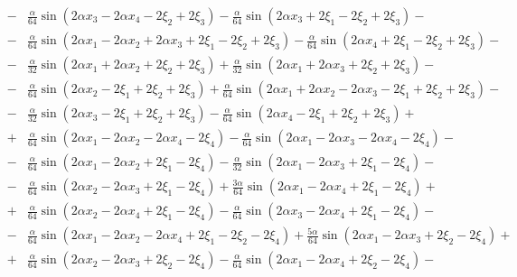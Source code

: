 \documentclass[11pt]{jfm}
\numberwithin{equation}{section}
\begin{document}
\begin{eqnarray}
&\!-\!&\frac{\alpha}{64} \sin(2\alpha x_3 \!-\! 2\alpha x_4 \!-\! 2\xi_2 \!+\! 2\xi_3) \!-\! \frac{\alpha}{64} \sin(2\alpha x_3 \!+\! 2\xi_1 \!-\! 2\xi_2 \!+\! 2\xi_3)\!-\!\nonumber\\
&\!-\!& \frac{\alpha}{64} \sin(2\alpha x_1 \!-\! 2\alpha x_2 \!+\! 2\alpha x_3 \!+\! 2\xi_1 \!-\! 2\xi_2 \!+\! 2\xi_3)\!-\! \frac{\alpha}{64} \sin(2\alpha x_4 \!+\! 2\xi_1 \!-\! 2\xi_2 \!+\! 2\xi_3)\!-\!\nonumber\\
&\!-\!& \frac{\alpha}{32} \sin(2\alpha x_1 \!+\! 2\alpha x_2 \!+\! 2\xi_2 \!+\! 2\xi_3)\!+\! \frac{\alpha}{32} \sin(2\alpha x_1 \!+\! 2\alpha x_3 \!+\! 2\xi_2 \!+\! 2\xi_3)\!-\!\nonumber\\
&\!-\!& \frac{\alpha}{64} \sin(2\alpha x_2 \!-\! 2\xi_1 \!+\! 2\xi_2 \!+\! 2\xi_3)\!+\! \frac{\alpha}{64} \sin(2\alpha x_1 \!+\! 2\alpha x_2 \!-\! 2\alpha x_3 \!-\! 2\xi_1 \!+\! 2\xi_2 \!+\! 2\xi_3)\!-\! \nonumber\\
&\!-\!& \frac{\alpha}{32} \sin(2\alpha x_3 \!-\! 2\xi_1 \!+\! 2\xi_2 \!+\! 2\xi_3)\!-\! \frac{\alpha}{64} \sin(2\alpha x_4 \!-\! 2\xi_1 \!+\! 2\xi_2 \!+\! 2\xi_3)\!+\! \nonumber\\
&\!+\!& \frac{\alpha}{64} \sin(2\alpha x_1 \!-\! 2\alpha x_2 \!-\! 2\alpha x_4 \!-\! 2\xi_4)\!-\!\frac{\alpha}{64} \sin(2\alpha x_1 \!-\! 2\alpha x_3 \!-\! 2\alpha x_4 \!-\! 2\xi_4)\!-\!\nonumber\\
&\!-\! &\frac{\alpha}{64} \sin(2\alpha x_1 \!-\! 2\alpha x_2 \!+\! 2\xi_1 \!-\! 2\xi_4)\!-\! \frac{\alpha}{32} \sin(2\alpha x_1 \!-\! 2\alpha x_3 \!+\! 2\xi_1 \!-\! 2\xi_4)\!-\!\nonumber\\
&\!-\!& \frac{\alpha}{64} \sin(2\alpha x_2 \!-\! 2\alpha x_3 \!+\! 2\xi_1 \!-\! 2\xi_4)\!+\! \frac{3\alpha}{64} \sin(2\alpha x_1 \!-\! 2\alpha x_4 \!+\! 2\xi_1 \!-\! 2\xi_4)\!+\!\nonumber\\
&\!+\!& \frac{\alpha}{64} \sin(2\alpha x_2 \!-\! 2\alpha x_4 \!+\! 2\xi_1 \!-\! 2\xi_4) \!-\!\frac{\alpha}{64} \sin(2\alpha x_3 \!-\! 2\alpha x_4 \!+\! 2\xi_1 \!-\! 2\xi_4)\!-\! \nonumber\\
&\!-\!& \frac{\alpha}{64} \sin(2\alpha x_1 \!-\! 2\alpha x_2 \!-\! 2\alpha x_4 \!+\! 2\xi_1 \!-\! 2\xi_2 \!-\! 2\xi_4)\!+\!\frac{5\alpha}{64} \sin(2\alpha x_1 \!-\! 2\alpha x_3 \!+\! 2\xi_2 \!-\! 2\xi_4)\!+\! \nonumber\\
&\!+\!& \frac{\alpha}{64} \sin(2\alpha x_2 \!-\! 2\alpha x_3 \!+\! 2\xi_2 \!-\! 2\xi_4)\!-\! \frac{\alpha}{64} \sin(2\alpha x_1 \!-\! 2\alpha x_4 \!+\! 2\xi_2 \!-\! 2\xi_4)\!-\! \nonumber\\

\end{eqnarray}
\end{document}
